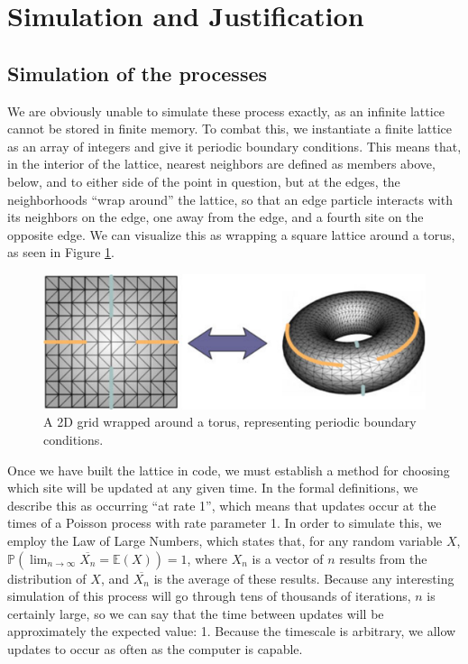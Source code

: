 \documentclass[notitlepage,reqno]{amsart}
\newcommand{\pr}{\mathbb{P}}
\newcommand{\E}{\mathbb{E}}
\begin{document}
\section{Simulation and Justification}

\subsection{Simulation of the processes}

We are obviously unable to simulate these process exactly, as an
infinite lattice cannot be stored in finite memory. To combat this, we
instantiate a finite lattice as an array of integers and give it periodic boundary
conditions. This means that, in the interior of the lattice, nearest
neighbors are defined as members above, below, and to either side of
the point in question, but at the edges, the neighborhoods ``wrap around''
the lattice, so that an edge particle interacts with its neighbors
on the edge, one away from the edge, and a fourth site on the
opposite edge. We can visualize this as wrapping a square lattice
around a torus, as seen in Figure \ref{fig:periodictorus}.

\begin{figure}[h t]
\includegraphics[width=.7\textwidth]{./images/torus.eps}
\caption{A 2D grid wrapped around a torus, representing periodic
  boundary conditions\cite{website:ising-model}.}
\label{fig:periodictorus}
\end{figure}

Once we have built the lattice in code, we must establish a method for
choosing which site will be updated at any given time. In the formal
definitions, we describe this as occurring ``at rate 1'', which means that updates occur at the times of a Poisson process
with rate parameter 1. In order to simulate this, we employ the
Law of Large Numbers, which states that, for any random variable
$X$, $\displaystyle\pr\left(\lim_{n\to\infty} \overline{X_n}=\E(X)\right) = 1$, where $X_n$ is
a vector of $n$ results from the distribution of $X$, and
$\overline{X_n}$ is the average of these results. Because any
interesting simulation of this process will go through tens of
thousands of iterations, $n$ is certainly large, so we can say that
the time between updates will be approximately the expected value:
1. Because the timescale is arbitrary, we allow updates to occur
as often as the computer is capable.
\end{document}
